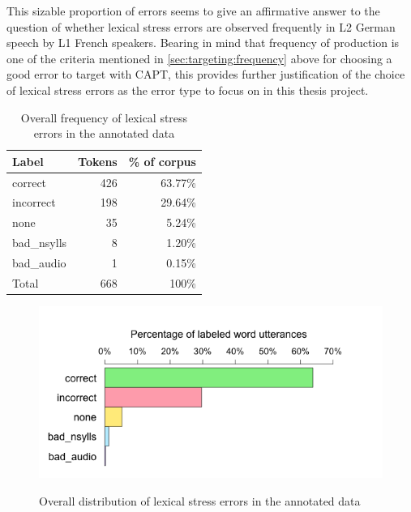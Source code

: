 				This sizable proportion of errors seems to give an affirmative answer to the question of whether lexical stress errors are observed frequently in L2 German speech by L1 French speakers. Bearing in mind that frequency of production is one of the criteria mentioned in \cref{sec:targeting:frequency} above for choosing a good error to target with CAPT, this provides further justification of the choice of lexical stress errors as the error type to focus on in this thesis project.
		
		\begin{table}
			\centering
			\caption{Overall frequency of lexical stress errors in the annotated data}
			\begin{tabular}{lrr}
			\toprule
			Label & Tokens & \% of corpus \\
			\midrule
			correct	& 426	& 63.77\% \\
			incorrect &	198	& 29.64\% \\
			none	 &35 &	5.24\% \\
			bad\_nsylls	& 8	& 1.20\% \\
			bad\_audio	& 1	& 0.15\%\\
			\midrule
			Total & 668 & 100\%\\
			\bottomrule
			\end{tabular}
			\label{tab:results:overall}
		\end{table}
		
		
		\begin{figure}
			\centering
			\includegraphics[width=.9\textwidth]{img/plots/overallJudgments-axisTop-noLabels}
			\label{fig:results:overallbars}
			\caption{Overall distribution of lexical stress errors in the annotated data}
		\end{figure}
		
